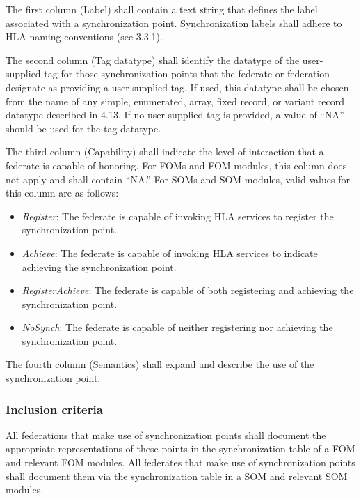 The first column (Label) shall contain a text string that defines the label associated with a synchronization point. Synchronization labels shall adhere to HLA naming conventions (see 3.3.1).

The second column (Tag datatype) shall identify the datatype of the user-supplied tag for those synchronization points that the federate or federation designate as providing a user-supplied tag. If used, this datatype shall be chosen from the name of any simple, enumerated, array, fixed record, or variant record datatype described in 4.13. If no user-supplied tag is provided, a value of ``NA'' should be used for the tag datatype.

The third column (Capability) shall indicate the level of interaction that a federate is capable of honoring. For FOMs and FOM modules, this column does not apply and shall contain ``NA.'' For SOMs and SOM modules, valid values for this column are as follows:
\begin{itemize}[topsep=1pt,itemsep=2pt]
\item \textit{Register}: The federate is capable of invoking HLA services to register the synchronization point.
\item \textit{Achieve}: The federate is capable of invoking HLA services to indicate achieving the synchronization point.
\item \textit{RegisterAchieve}: The federate is capable of both registering and achieving the synchronization point.
\item \textit{NoSynch}: The federate is capable of neither registering nor achieving the synchronization point.
\end{itemize}

The fourth column (Semantics) shall expand and describe the use of the synchronization point.

\vspace{23.5pt}

\subsubsection{Inclusion criteria}
All federations that make use of synchronization points shall document the appropriate representations of these points in the synchronization table of a FOM and relevant FOM modules. All federates that make use of synchronization points shall document them via the synchronization table in a SOM and relevant SOM modules.

\newpage

